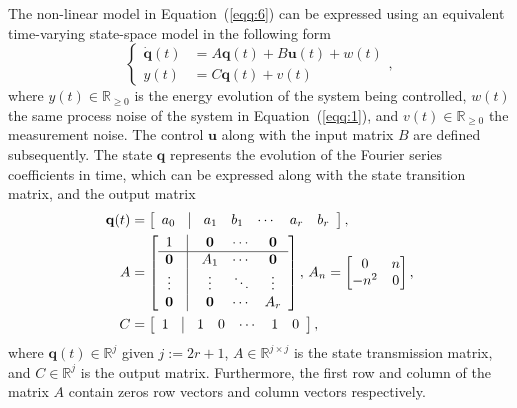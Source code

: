 \documentclass[letterpaper,10pt,conference]{ieeeconf}
\begin{document}
The non-linear model in Equation~(\ref{eqq:6}) can be expressed using an equivalent time-varying state-space model in the following form
\begin{equation}\label{eqq:7}\begin{cases}
  \dot{\mathbf{q}}(t)&=A\mathbf{q}(t)+B\mathbf{u}(t)+w(t)\\
  y(t)&=C\mathbf{q}(t)+v(t)
\end{cases},\end{equation}
where $y(t)\in\mathbb{R}_{\geq 0}$ is the energy evolution of the system being controlled, $w(t)$ the same process noise of the system in Equation~(\ref{eqq:1}), and $v(t)\in\mathbb{R}_{\geq 0}$ the measurement noise. The control $\mathbf{u}$ along with the input matrix $B$ are defined subsequently. The state $\mathbf{q}$ represents the evolution of the Fourier series coefficients in time, which can be expressed along with the state transition matrix, and the output matrix
\begin{equation}\begin{split}
  \mathbf{q}(t)&=\left[\begin{array}{ccccccc}
    a_0 & \vline & a_1 & b_1 & \cdots & a_r & b_r
  \end{array}\right],\\
  A&=\left[\begin{array}{ccccc}
    1          & \vline & \mathbf{0} & \cdots & \mathbf{0} \\\hline
    \mathbf{0} & \vline & A_1        & \cdots & \mathbf{0} \\
    \vdots     & \vline & \vdots     & \ddots & \vdots     \\
    \mathbf{0} & \vline & \mathbf{0} & \cdots & A_r 
  \end{array}\right],\,A_n=\begin{bmatrix}0 & n \\ -n^2 & 0\end{bmatrix},\\
  C&=\left[\begin{array}{ccccccc}
    1 & \vline & 1 & 0 & \cdots & 1 & 0
  \end{array}\right],
\end{split}\end{equation}
where $\mathbf{q}(t)\in\mathbb{R}^j$ given $j:=2r+1$, $A\in\mathbb{R}^{j\times j}$ is the state transmission matrix, and $C\in\mathbb{R}^j$ is the output matrix. Furthermore, the first row and column of the matrix $A$ contain zeros row vectors and column vectors respectively.
\end{document}
